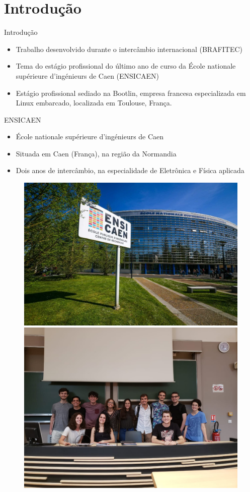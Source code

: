\section{Introdução}
\begin{frame}{Introdução}
	\begin{itemize}
	    \item Trabalho desenvolvido durante o intercâmbio internacional (BRAFITEC)
	    \item Tema do estágio profissional do último ano de curso da École nationale supérieure d'ingénieurs de Caen (ENSICAEN)
	    \item Estágio profissional sediado na Bootlin, empresa francesa especializada em Linux embarcado, localizada em Toulouse, França.
	\end{itemize}
\end{frame}

\begin{frame}{ENSICAEN}
\begin{itemize}
    \item École nationale supérieure d'ingénieurs de Caen
    \item Situada em Caen (França), na região da Normandia
    \item Dois anos de intercâmbio, na especialidade de Eletrônica e Física aplicada
\end{itemize}

\begin{figure}
    \centering
    \includegraphics[width=0.4\columnwidth]{figuras/ENSICAEN-batiment-A.jpg}
    \includegraphics[scale=0.085]{figuras/pessoal_ensi.jpeg}
    \label{fig:my_label}
\end{figure}
\end{frame}


